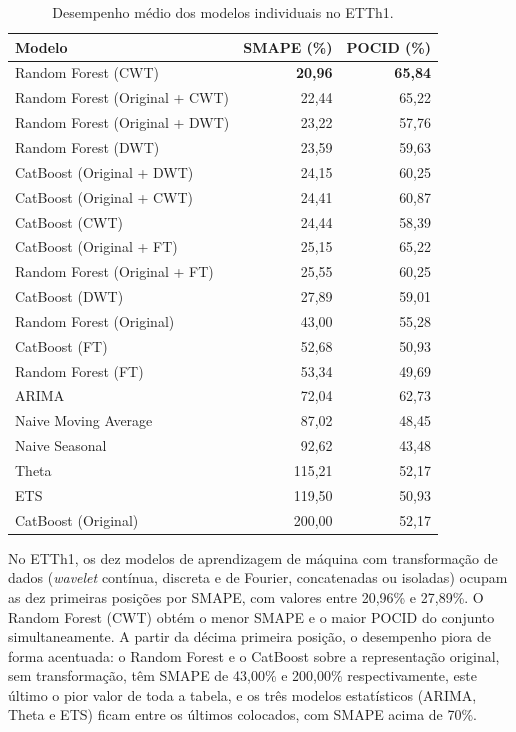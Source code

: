 \begin{table}[H]
\small
\centering
\caption{Desempenho médio dos modelos individuais no ETTh1.}
\label{tab:etth1-individual}
\begin{tabular}{@{}lrr@{}}
\toprule
\textbf{Modelo} & \textbf{SMAPE (\%)} & \textbf{POCID (\%)} \\
\midrule
Random Forest (CWT)                  & \textbf{20,96} & \textbf{65,84} \\
Random Forest (Original + CWT)       & 22,44 & 65,22 \\
Random Forest (Original + DWT)       & 23,22 & 57,76 \\
Random Forest (DWT)                  & 23,59 & 59,63 \\
CatBoost (Original + DWT)            & 24,15 & 60,25 \\
CatBoost (Original + CWT)            & 24,41 & 60,87 \\
CatBoost (CWT)                       & 24,44 & 58,39 \\
CatBoost (Original + FT)             & 25,15 & 65,22 \\
Random Forest (Original + FT)        & 25,55 & 60,25 \\
CatBoost (DWT)                       & 27,89 & 59,01 \\
Random Forest (Original)             & 43,00 & 55,28 \\
CatBoost (FT)                        & 52,68 & 50,93 \\
Random Forest (FT)                   & 53,34 & 49,69 \\
ARIMA                                & 72,04 & 62,73 \\
Naive Moving Average                 & 87,02 & 48,45 \\
Naive Seasonal                       & 92,62 & 43,48 \\
Theta                                & 115,21 & 52,17 \\
ETS                                  & 119,50 & 50,93 \\
CatBoost (Original)                  & 200,00 & 52,17 \\
\bottomrule
\end{tabular}
\end{table}

No ETTh1, os dez modelos de aprendizagem de máquina com transformação de dados (\textit{wavelet} contínua, discreta e de Fourier, concatenadas ou isoladas) ocupam as dez primeiras posições por SMAPE, com valores entre 20,96\% e 27,89\%. O Random Forest (CWT) obtém o menor SMAPE e o maior POCID do conjunto simultaneamente. A partir da décima primeira posição, o desempenho piora de forma acentuada: o Random Forest e o CatBoost sobre a representação original, sem transformação, têm SMAPE de 43,00\% e 200,00\% respectivamente, este último o pior valor de toda a tabela, e os três modelos estatísticos (ARIMA, Theta e ETS) ficam entre os últimos colocados, com SMAPE acima de 70\%.

